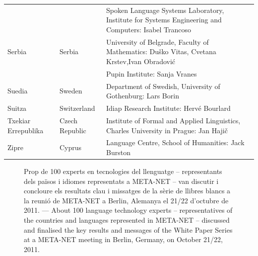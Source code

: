 \begin{longtable}{@{}llp{113mm}@{}}
  & & Spoken Language Systems Laboratory, Institute for Systems Engineering and Computers: Isabel Trancoso \\ \addlinespace
  Serbia & \textcolor{grey1}{Serbia} & University of Belgrade, Faculty of Mathematics: Duško Vitas, Cvetana Krstev,\newline Ivan Obradović \\ \addlinespace
  & & Pupin Institute: Sanja Vranes \\ \addlinespace  
  Suedia & \textcolor{grey1}{Sweden} & Department of Swedish, University of Gothenburg: Lars Borin \\ \addlinespace 
  Suitza & \textcolor{grey1}{Switzerland} & Idiap Research Institute: Hervé Bourlard \\ \addlinespace 
  Txekiar Errepublika & \textcolor{grey1}{Czech Republic} & Institute of Formal and Applied Linguistics, Charles University in Prague: Jan Hajič \\ \addlinespace
  Zipre & \textcolor{grey1}{Cyprus} & Language Centre, School of Humanities: Jack Burston
\end{longtable}
\normalsize

\renewcommand*{\figureformat}{}
\renewcommand*{\captionformat}{}

\begin{figure}[htbp]
  \center
  \caption{Prop de 100 experts en tecnologies del llenguatge -- representants dels països i idiomes representats a META-NET --  van discutir i concloure els resultats clau i missatges de la sèrie de llibres blancs a la reunió de META-NET a Berlin, Alemanya el 21/22 d'octubre de 2011. ---
 \textcolor{grey1}{About 100 language technology experts -- representatives of the countries and languages represented in META-NET -- discussed and finalised the key results and messages of the White Paper Series at a META-NET meeting in Berlin, Germany, on October 21/22, 2011.}}
  \medskip
\end{figure}

\cleardoublepage

\label{whitepaperseries}

